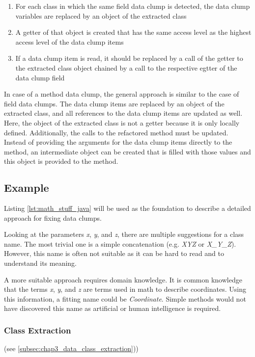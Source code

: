 \begin{enumerate}
    \item For each class in which the same field data clump is detected, the data clump variables are replaced by an object of the extracted class
    \item A getter of that object is created that has the same access level as the highest access level of the data clump items
    \item If a data clump item is read, it should be replaced by a call of the getter to the extracted class object chained by a call to the respective egtter of the data clump field
\end{enumerate}



In case of a method data clump, the general approach is similar to the case of field data clumps. The data clump items are replaced by an object of the extracted class, and all references to the data clump items are updated as well. Here, the object of the extracted class is not a getter because it is only locally defined. Additionally, the calls to the refactored method must be updated. Instead of providing the arguments for the data clump items directly to the method, an intermediate object can be created that is filled with those values and this object is provided to the method. 



\subsection{Example}
Listing \ref{lst:math_stuff_java} will be used as the foundation to describe a detailed approach for fixing data clumps.

Looking at the parameters \textit{x}, \textit{y}, and \textit{z}, there are multiple suggestions for a class name. The most trivial one is a simple concatenation  (e.g. \textit{XYZ} or \textit{X\_Y\_Z}). However, this name is often not suitable as it can be hard to read and to understand its meaning.

A more suitable approach requires domain knowledge. It is common knowledge that the terms \textit{x}, \textit{y}, and \textit{z} are terms used in math to describe coordinates. Using this information, a fitting name could be \textit{Coordinate}. Simple methods would not have discovered this name as artificial or human intelligence is required. 

\subsubsection{Class Extraction} (see \ref{subsec:chap3_data_class_extraction}))

